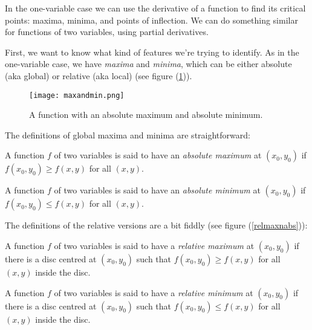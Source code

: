   In the one-variable case we can use the derivative of a function to find its critical points: maxima, minima, and points of inflection.  We can do something similar for functions of two variables, using partial derivatives.

  First, we want to know what kind of features we're trying to identify.  As in the one-variable case, we have \emph{maxima} and \emph{minima}, which can be either absolute (aka global) or relative (aka local) (see figure (\ref{absmaxmin})).

\begin{figure}[!htbp]
\centering
 \texttt{[image: maxandmin.png]}
\caption{A function with an absolute maximum and absolute minimum.}
\label{absmaxmin}
\end{figure}

  The definitions of global maxima and minima are straightforward:

  \begin{definition}
    A function $f$ of two variables is said to have an \emph{absolute maximum} at $(x_0, y_0)$ if $f(x_0, y_0) \geq f(x, y)$ for all $(x, y)$.

    A function $f$ of two variables is said to have an \emph{absolute minimum} at $(x_0, y_0)$ if $f(x_0, y_0) \leq f(x, y)$ for all $(x, y)$.
  \end{definition}

\newpage

  The definitions of the relative versions are a bit fiddly (see figure (\ref{relmaxnabs})):

  \begin{definition}
    A function $f$ of two variables is said to have a \emph{relative maximum} at $(x_0, y_0)$ if there is a disc centred at $(x_0, y_0)$ such that $f(x_0, y_0) \geq f(x, y)$ for all $(x, y)$ inside the disc.

    A function $f$ of two variables is said to have a \emph{relative minimum} at $(x_0, y_0)$ if there is a disc centred at $(x_0, y_0)$ such that $f(x_0, y_0) \leq f(x, y)$ for all $(x, y)$ inside the disc.
  \end{definition}


